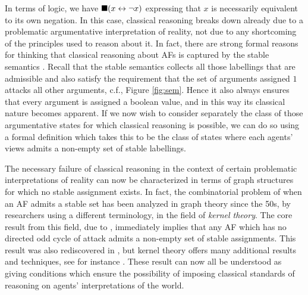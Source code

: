 \documentclass[greybox]{svmult}
\begin{document}
In terms of logic, we have $\blacksquare (x \leftrightarrow \neg x)$ expressing that $x$ is necessarily equivalent to its own negation. In this case, classical reasoning breaks down already due to a problematic argumentative interpretation of reality, not due to any shortcoming of the principles used to reason about it. In fact, there are strong formal reasons for thinking that classical reasoning about AFs is captured by the stable semantics \cite{dyrkolbotn}. Recall that the stable semantics collects all those labellings that are admissible and also satisfy the requirement that the set of arguments assigned $1$ attacks all other arguments, c.f., Figure \ref{fig:sem}. Hence it also always ensures that every argument is assigned a boolean value, and in this way its classical nature becomes apparent. If we now wish to consider separately the class of those argumentative states for which classical reasoning is possible, we can do so using a formal definition which takes this to be the class of states where each agents' views admits a non-empty set of stable labellings.

The necessary failure of classical reasoning in the context of certain problematic interpretations of reality can now be characterized in terms of graph structures for which no stable assignment exists. 
In fact, the combinatorial problem of when an AF admits a stable set has been analyzed in graph theory since the 50s, by researchers using a different terminology, in the field of \emph{kernel theory}. The core result from this field, due to \cite{richardson}, immediately implies that any AF which has no directed odd cycle of attack admits a non-empty set of stable assignments. This result was also rediscovered in \cite{dung}, but kernel theory offers many additional results and techniques, see for instance \cite{sanches}. These result can now all be understood as giving conditions which ensure the possibility of imposing classical standards of reasoning on agents' interpretations of the world.

\end{document}
